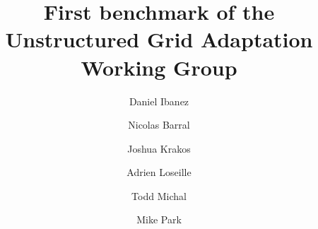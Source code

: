 \documentclass[3p,times,procedia,number]{elsarticle}
\begin{document}
\begin{frontmatter}




\title{First benchmark of the Unstructured Grid Adaptation Working Group}




\author[a]{Daniel Ibanez}
\author[b]{Nicolas Barral}
\author[c]{Joshua Krakos}
\author[d]{Adrien Loseille}
\author[c]{Todd Michal}
\author[e]{Mike Park}

\address[a]{Sandia National Laboratories, P.O. Box 5800, Albuquerque, NM 87185-1321, United States}
\address[b]{Department of Earth Science and Engineering, Imperial College London, South Kensington Campus, London SW7 2AZ, UK}
\address[c]{The Boeing Company [TODO]}
\address[d]{INRIA Saclay-\^ile-de-France, B\^atiment Alan Turing, 91120 Palaiseau, France}
\address[e]{NASA Langley Research Center, Mail Stop 128, Hampton, VA 23681, United States}


\end{frontmatter}
\end{document}
